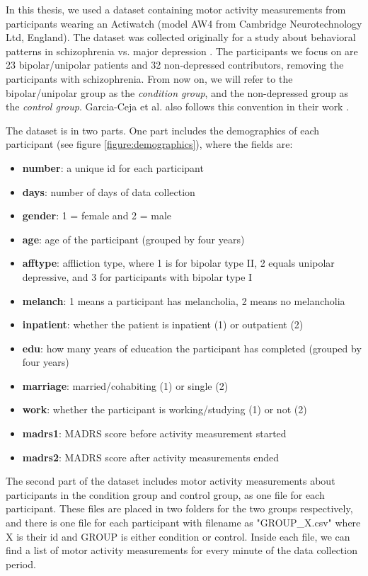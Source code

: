 In this thesis, we used a dataset containing motor activity measurements from participants wearing an Actiwatch (model AW4 from Cambridge Neurotechnology Ltd, England). The dataset was collected originally for a study about behavioral patterns in schizophrenia vs. major depression \cite{Berle2010}. The participants we focus on are 23 bipolar/unipolar patients and 32 non-depressed contributors, removing the participants with schizophrenia. From now on, we will refer to the bipolar/unipolar group as the \textit{condition group}, and the non-depressed group as the \textit{control group}. Garcia-Ceja et al. also follows this convention in their work \cite{GarciaCeja2018_classification_bipolar}.

The dataset is in two parts. One part includes the demographics of each participant (see figure \ref{figure:demographics}), where the fields are:

\begin{itemize}
    \item \textbf{number}: a unique id for each participant
    \item \textbf{days}: number of days of data collection 
    \item \textbf{gender}: 1 = female and 2 = male
    \item \textbf{age}: age of the participant (grouped by four years)
    \item \textbf{afftype}: affliction type, where 1 is for bipolar type II, 2 equals unipolar depressive, and 3 for participants with bipolar type I
    \item \textbf{melanch}: 1 means a participant has melancholia, 2 means no melancholia
    \item \textbf{inpatient}: whether the patient is inpatient (1) or outpatient (2)
    \item \textbf{edu}: how many years of education the participant has completed (grouped by four years)
    \item \textbf{marriage}: married/cohabiting (1) or single (2)
    \item \textbf{work}: whether the participant is working/studying (1) or not (2)
    \item \textbf{madrs1}: MADRS score before activity measurement started
    \item \textbf{madrs2}: MADRS score after activity measurements ended
\end{itemize}

The second part of the dataset includes motor activity measurements about participants in the condition group and control group, as one file for each participant. These files are placed in two folders for the two groups respectively, and there is one file for each participant with filename as "GROUP\_X.csv" where X is their id and GROUP is either condition or control. Inside each file, we can find a list of motor activity measurements for every minute of the data collection period.

